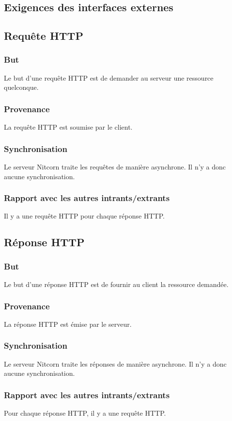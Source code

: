 \documentclass{scrreprt}
\begin{document}
\begin{itemizen}
\section{Exigences des interfaces externes}
\subsection{Requête HTTP}
\subsubsection{But} Le but d'une requête HTTP est de demander au serveur une ressource quelconque.
\subsubsection{Provenance} La requête HTTP est soumise par le client.
\subsubsection{Synchronisation} Le serveur Nitcorn traite les requêtes de manière asynchrone. Il n'y a donc aucune synchronisation.
\subsubsection{Rapport avec les autres intrants/extrants} Il y a une requête HTTP pour chaque réponse HTTP.
\subsection{Réponse HTTP}
\subsubsection{But} Le but d'une réponse HTTP est de fournir au client la ressource demandée.
\subsubsection{Provenance} La réponse HTTP est émise par le serveur.
\subsubsection{Synchronisation} Le serveur Nitcorn traite les réponses de manière asynchrone. Il n'y a donc aucune synchronisation.
\subsubsection{Rapport avec les autres intrants/extrants} Pour chaque réponse HTTP, il y a une requête HTTP.

\end{itemizen}
\end{document}
